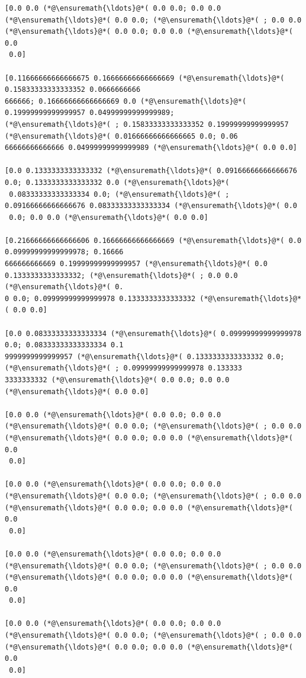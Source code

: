 \documentclass[12pt,a4paper]{article}
\begin{document}
\begin{lstlisting}
[0.0 0.0 (*@\ensuremath{\ldots}@*( 0.0 0.0; 0.0 0.0 (*@\ensuremath{\ldots}@*( 0.0 0.0; (*@\ensuremath{\ldots}@*( ; 0.0 0.0 (*@\ensuremath{\ldots}@*( 0.0 0.0; 0.0 0.0 (*@\ensuremath{\ldots}@*( 0.0
 0.0]

[0.11666666666666675 0.16666666666666669 (*@\ensuremath{\ldots}@*( 0.15833333333333352 0.0666666666
666666; 0.16666666666666669 0.0 (*@\ensuremath{\ldots}@*( 0.19999999999999957 0.04999999999999989; 
(*@\ensuremath{\ldots}@*( ; 0.15833333333333352 0.19999999999999957 (*@\ensuremath{\ldots}@*( 0.01666666666666665 0.0; 0.06
66666666666666 0.04999999999999989 (*@\ensuremath{\ldots}@*( 0.0 0.0]

[0.0 0.1333333333333332 (*@\ensuremath{\ldots}@*( 0.09166666666666676 0.0; 0.1333333333333332 0.0 (*@\ensuremath{\ldots}@*(
 0.08333333333333334 0.0; (*@\ensuremath{\ldots}@*( ; 0.09166666666666676 0.08333333333333334 (*@\ensuremath{\ldots}@*( 0.0
 0.0; 0.0 0.0 (*@\ensuremath{\ldots}@*( 0.0 0.0]

[0.21666666666666606 0.16666666666666669 (*@\ensuremath{\ldots}@*( 0.0 0.09999999999999978; 0.16666
666666666669 0.19999999999999957 (*@\ensuremath{\ldots}@*( 0.0 0.1333333333333332; (*@\ensuremath{\ldots}@*( ; 0.0 0.0 (*@\ensuremath{\ldots}@*( 0.
0 0.0; 0.09999999999999978 0.1333333333333332 (*@\ensuremath{\ldots}@*( 0.0 0.0]

[0.0 0.08333333333333334 (*@\ensuremath{\ldots}@*( 0.09999999999999978 0.0; 0.08333333333333334 0.1
9999999999999957 (*@\ensuremath{\ldots}@*( 0.1333333333333332 0.0; (*@\ensuremath{\ldots}@*( ; 0.09999999999999978 0.133333
3333333332 (*@\ensuremath{\ldots}@*( 0.0 0.0; 0.0 0.0 (*@\ensuremath{\ldots}@*( 0.0 0.0]

[0.0 0.0 (*@\ensuremath{\ldots}@*( 0.0 0.0; 0.0 0.0 (*@\ensuremath{\ldots}@*( 0.0 0.0; (*@\ensuremath{\ldots}@*( ; 0.0 0.0 (*@\ensuremath{\ldots}@*( 0.0 0.0; 0.0 0.0 (*@\ensuremath{\ldots}@*( 0.0
 0.0]

[0.0 0.0 (*@\ensuremath{\ldots}@*( 0.0 0.0; 0.0 0.0 (*@\ensuremath{\ldots}@*( 0.0 0.0; (*@\ensuremath{\ldots}@*( ; 0.0 0.0 (*@\ensuremath{\ldots}@*( 0.0 0.0; 0.0 0.0 (*@\ensuremath{\ldots}@*( 0.0
 0.0]

[0.0 0.0 (*@\ensuremath{\ldots}@*( 0.0 0.0; 0.0 0.0 (*@\ensuremath{\ldots}@*( 0.0 0.0; (*@\ensuremath{\ldots}@*( ; 0.0 0.0 (*@\ensuremath{\ldots}@*( 0.0 0.0; 0.0 0.0 (*@\ensuremath{\ldots}@*( 0.0
 0.0]

[0.0 0.0 (*@\ensuremath{\ldots}@*( 0.0 0.0; 0.0 0.0 (*@\ensuremath{\ldots}@*( 0.0 0.0; (*@\ensuremath{\ldots}@*( ; 0.0 0.0 (*@\ensuremath{\ldots}@*( 0.0 0.0; 0.0 0.0 (*@\ensuremath{\ldots}@*( 0.0
 0.0]


\end{lstlisting}
\end{document}
